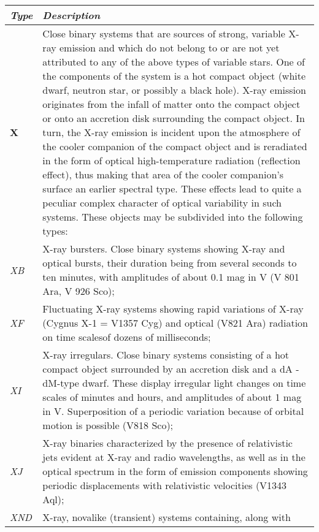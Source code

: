 \begin{longtabu} to \textwidth {l|X}\toprule
\emph{Type}& \emph{Description}\\\midrule
\textbf{X} & Close binary systems that are sources of strong, variable
             X-ray emission and which do not belong to or are not yet attributed to
             any of the above types of variable stars. One of the components of the
             system is a hot compact object (white dwarf, neutron star, or possibly a
             black hole). X-ray emission originates from the infall of matter onto
             the compact object or onto an accretion disk surrounding the compact
             object. In turn, the X-ray emission is incident upon the atmosphere of
             the cooler companion of the compact object and is reradiated in the form
             of optical high-temperature radiation (reflection effect), thus making
             that area of the cooler companion's surface an earlier spectral type.
             These effects lead to quite a peculiar complex character of optical
             variability in such systems. These objects may be subdivided into the
             following types:\\\midrule
\emph{XB}  & X-ray bursters. Close binary systems showing X-ray and
             optical bursts, their duration being from several seconds to ten
             minutes, with amplitudes of about 0.1 mag in V (V 801 Ara, V 926 Sco);\\\midrule
\emph{XF}  & Fluctuating X-ray systems showing rapid variations of X-ray
             (Cygnus X-1 = V1357 Cyg) and optical (V821 Ara) radiation on time scalesof dozens of milliseconds;\\\midrule
\emph{XI}  & X-ray irregulars. Close binary systems consisting of a hot
             compact object surrounded by an accretion disk and a dA - dM-type dwarf.
             These display irregular light changes on time scales of minutes and
             hours, and amplitudes of about 1 mag in V. Superposition of a periodic
             variation because of orbital motion is possible (V818 Sco);\\\midrule
\emph{XJ}  & X-ray binaries characterized by the presence of relativistic
             jets evident at X-ray and radio wavelengths, as well as in the optical
             spectrum in the form of emission components showing periodic
             displacements with relativistic velocities (V1343 Aql);\\\midrule
\emph{XND} & X-ray, novalike (transient) systems containing, along with

\end{longtabu}
